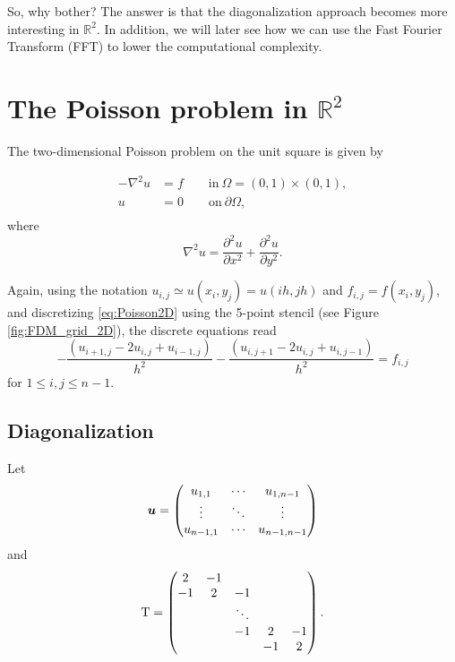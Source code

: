 So, why bother? The answer is that the diagonalization approach becomes more
interesting in $\mathbb{R}^2$. In addition, we will later see how we can use the
Fast Fourier Transform (FFT) to lower the computational complexity.

\section{The Poisson problem in $\mathbb{R}^2$}

The two-dimensional Poisson problem on the unit square is given by

\begin{equation}
  \begin{split}
    -\nabla^2 u &= f \qquad \text{in} ~ \Omega=(0,1) \times (0,1), \\
    u &= 0 \qquad \text{on} ~ \partial \Omega, \\
  \end{split}
  \label{eq:Poisson2D}
\end{equation}
where
\[
  \nabla^2 u = \frac{\partial^2 u}{\partial x^2}
  + \frac{\partial^2 u}{\partial y^2}.
\]


Again, using the notation $u_{i,j} \simeq u(x_i,y_j) = u(i h, j h)$ and
$f_{i,j}=f(x_i,y_j)$, and discretizing \eqref{eq:Poisson2D} using the 5-point
stencil (see Figure \ref{fig:FDM_grid_2D}), the discrete equations read
\begin{equation}
  -\frac{(u_{i+1,j}-2u_{i,j}+u_{i-1,j})}{h^2} - \frac{(u_{i,j+1}-2u_{i,j}+u_{i,j-1})}{h^2} = f_{i,j}
  \label{eq:FDM_sys}
\end{equation}
for $1 \leq i,j \leq n-1$.

\subsection{Diagonalization}

Let
\begin{equation*}
  {{\boldsymbol u}} =
  \begin{pmatrix}
    u_{1,1} & \cdots & u_{1,n-1} \\
    \vdots & \ddots & \vdots \\
    u_{n-1,1} & \cdots & u_{n-1,n-1}
  \end{pmatrix}
\end{equation*}
and
\begin{equation*}
  {\mathrm T} =
  \begin{pmatrix}
    2 & -1 & & & \\
    -1 & 2 & -1 & & \\
    & & \ddots & & \\
    & & -1 & 2 & -1 \\
    & & & -1 & 2
  \end{pmatrix}.
\end{equation*}


